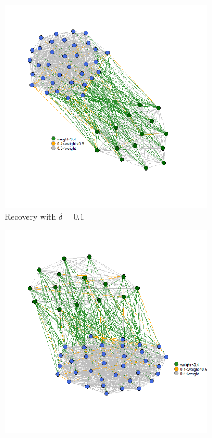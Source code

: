 \documentclass[12pt]{amsart}
\theoremstyle{remark}
\begin{document}
\begin{figure}[h]
\begin{subfigure}[b]{0.37\textwidth}
         \includegraphics[width=\textwidth]{./Pictures/recupera1.png}
         \caption{Recovery with $\delta=0.1$}
     \end{subfigure}
     \hfill
     \begin{subfigure}[b]{0.37\textwidth}
         \centering
         \includegraphics[width=\textwidth]{./Pictures/recupera2.png}

\end{subfigure}
\end{figure}
\end{document}
